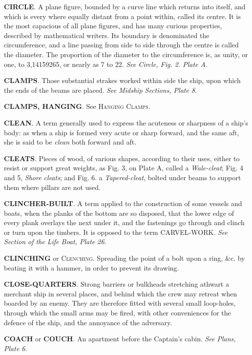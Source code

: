 \textbf{CIRCLE}. A plane figure, bounded by a curve line which returns into itself, and which is every where equally distant from a point within, called its centre. It is the most capacious of all plane figures, and has many curious properties, described by mathematical writers. Its boundary is denominated the circumference, and a line passing from side to side through the centre is called the diameter. The proportion of the diameter to the circumference is, as unity, or one, to 3,14159265, or nearly as 7 to 22. \textit{See Circle, Fig. 2. Plate A}. 

\textbf{CLAMPS}. Those substantial strakes worked within side the ship, upon which the ends of the beams are placed. \textit{See Midship Sections, Plate 8}. 

\textbf{CLAMPS, HANGING}. See \textsc{Hanging Clamps}. 

\textbf{CLEAN}. A term generally used to express the acuteness or sharpness of a ship's body: as when a ship is formed very acute or sharp forward, and the same aft, she is said to be \textit{clean} both forward and aft. 

\textbf{CLEATS}. Pieces of wood, of various shapes, according to their uses, either to resist or support great weights, as Fig. 3, on Plate A, called a \textit{Wale-cleat}; Fig. 4 and 5, \textit{Shore cleats}; and Fig. 6. a \textit{Tapered-cleat}, bolted under beams to support them where pillars are not used.

\textbf{CLINCHER-BUILT}. A term applied to the construction of some vessels and boats, when the planks of the bottom are so disposed, that the lower edge of every plank overlays the next under it, and the fastenings go through and clinch or turn upon the timbers. It is opposed to the term CARVEL-WORK. \textit{See Section of the Life Boat, Plate 26}. 

\textbf{CLINCHING} or \textsc{Clenching}. Spreading the point of a bolt upon a ring, \&c. by beating it with a hammer, in order to prevent its drawing. 

\textbf{CLOSE-QUARTERS}. Strong barriers or bulkheads stretching athwart a merchant ship in several places, and behind which the crew may retreat when boarded by an enemy. They are therefore fitted with several small loop-holes, through which the small arms may be fired, with other conveniences for the defence of the ship, and the annoyance of the adversary. 

\textbf{COACH} or \textbf{COUCH}. An apartment before the Captain's cabin. \textit{See Plans, Plate 6}. 

